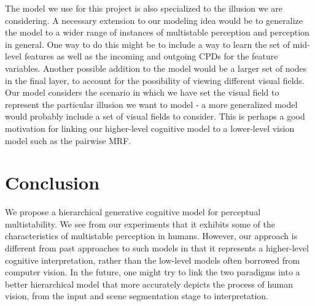 \documentclass{article} %
\begin{document}
The model we use for this project is also specialized to the illusion we are considering. A necessary extension to our modeling idea would be to generalize the model to a wider range of instances of multistable perception and perception in general. One way to do this might be to include a way to learn the set of mid-level features as well as the incoming and outgoing CPDs for the feature variables. Another possible addition to the model would be a larger set of nodes in the final layer, to account for the possibility of viewing different visual fields. Our model considers the scenario in which we have set the visual field to represent the particular illusion we want to model - a more generalized model would probably include a set of visual fields to consider. This is perhaps a good motivation for linking our higher-level cognitive model to a lower-level vision model such as the pairwise MRF.

\section{Conclusion}

We propose a hierarchical generative cognitive model for perceptual multistability. We see from our experiments that it exhibits some of the characteristics of multistable perception in humans. However, our approach is different from past approaches to such models in that it represents a higher-level cognitive interpretation, rather than the low-level models often borrowed from computer vision. In the future, one might try to link the two paradigms into a better hierarchical model that more accurately depicts the process of human vision, from the input and scene segmentation stage to interpretation.
\end{document}
